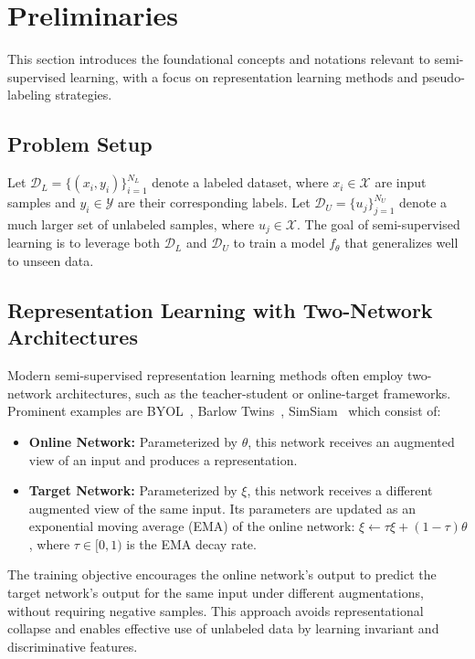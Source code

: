 \section{Preliminaries}

This section introduces the foundational concepts and notations relevant to semi-supervised learning, with a focus on representation learning methods and pseudo-labeling strategies.

\subsection{Problem Setup}

Let $\mathcal{D}_L = \{(x_i, y_i)\}_{i=1}^{N_L}$ denote a labeled dataset, where $x_i \in \mathcal{X}$ are input samples and $y_i \in \mathcal{Y}$ are their corresponding labels. Let $\mathcal{D}_U = \{u_j\}_{j=1}^{N_U}$ denote a much larger set of unlabeled samples, where $u_j \in \mathcal{X}$. The goal of semi-supervised learning is to leverage both $\mathcal{D}_L$ and $\mathcal{D}_U$ to train a model $f_\theta$ that generalizes well to unseen data.

\subsection{Representation Learning with Two-Network Architectures}

Modern semi-supervised representation learning methods often employ two-network architectures, such as the teacher-student or online-target frameworks. Prominent examples are BYOL~\cite{grill2020bootstrap}, Barlow Twins~\cite{zbontar2021barlow}, SimSiam~\cite{chen2020exploring} which consist of:

\begin{itemize}
    \item \textbf{Online Network:} Parameterized by $\theta$, this network receives an augmented view of an input and produces a representation.
    \item \textbf{Target Network:} Parameterized by $\xi$, this network receives a different augmented view of the same input. Its parameters are updated as an exponential moving average (EMA) of the online network: $\xi \leftarrow \tau \xi + (1-\tau)\theta$, where $\tau \in [0,1)$ is the EMA decay rate.
\end{itemize}

The training objective encourages the online network's output to predict the target network's output for the same input under different augmentations, without requiring negative samples. This approach avoids representational collapse and enables effective use of unlabeled data by learning invariant and discriminative features.

